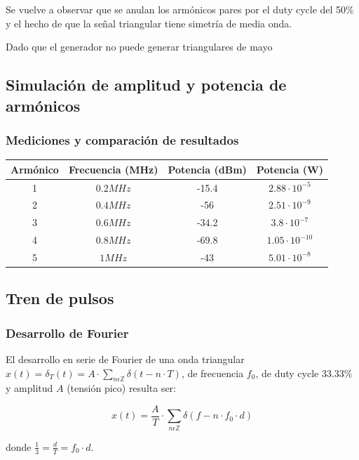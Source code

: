 \documentclass[../../labo_tp5_main.tex]{subfiles}
\begin{document}
Se vuelve a observar que se anulan los armónicos pares por el duty cycle del 50\% y el hecho de que la señal triangular tiene simetría de media onda.\par
Dado que el generador no puede generar triangulares de mayo
\subsection{Simulación de amplitud y potencia de armónicos}



\subsubsection{Mediciones y comparación de resultados}
\begin{table}[H] %
	\centering
 		\begin{tabular}{||c c c c||} 
 			\hline
			Armónico & Frecuencia (MHz) & Potencia (dBm) & Potencia (W)\\ [0.5ex] 
 			\hline\hline
			1 & $0.2MHz$ & -15.4 & $2.88\cdot 10^{-5}$\\
			2 & $0.4MHz$ & -56 & $2.51\cdot 10^{-9}$\\
			3 & $0.6MHz$ & -34.2 & $3.8\cdot 10^{-7}$\\
			4 & $0.8MHz$ & -69.8 & $1.05\cdot 10^{-10}$\\
			5 & $1MHz$ & -43 & $5.01\cdot 10^{-8}$\\[1ex] 
			\hline
		\end{tabular}
\end{table}


\subsection{Tren de pulsos}

\subsubsection{Desarrollo de Fourier}

El desarrollo en serie de Fourier de una onda triangular $x(t) = \delta_T(t) = A\cdot\sum_{n\epsilon \mathbb{Z}}\delta(t-n\cdot T)$, de frecuencia $f_0$, de duty cycle 33.33\% y amplitud $A$ (tensión pico) resulta ser: \par

\begin{center}
$$x(t) = \frac{A}{T}\cdot\sum_{n\epsilon \mathbb{Z}}\delta(f-n\cdot f_0\cdot d)$$
\end{center}
donde $\frac{1}{3} = \frac{d}{T} = f_0\cdot d$.
\end{document}
